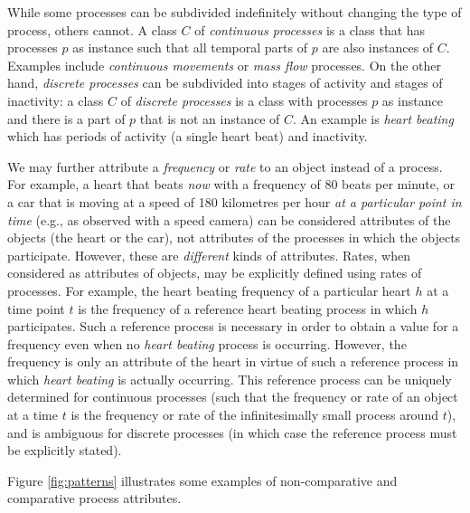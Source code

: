 \documentclass{bioinfo}
\begin{document}
While some processes can be subdivided indefinitely without changing
the type of process, others cannot. A class $C$ of {\em continuous
  processes} is a class that has processes $p$ as instance such that
all temporal parts of $p$ are also instances of $C$. Examples include
{\em continuous movements} or {\em mass flow} processes. On the other
hand, {\em discrete processes} can be subdivided into stages of
activity and stages of inactivity: a class $C$ of {\em discrete
  processes} is a class with processes $p$ as instance and there is a
part of $p$ that is not an instance of $C$. An example is {\em heart
  beating} which has periods of activity (a single heart beat) and
inactivity.

We may further attribute a {\em frequency} or {\em rate} to an object
instead of a process. For example, a heart that beats {\em now} with a
frequency of 80 beats per minute, or a car that is moving at a speed
of 180 kilometres per hour {\em at a particular point in time} (e.g.,
as observed with a speed camera) can be considered attributes of the
objects (the heart or the car), not attributes of the processes in
which the objects participate. However, these are {\em different}
kinds of attributes. Rates, when considered as attributes of objects,
may be explicitly defined using rates of processes. For example, the
heart beating frequency of a particular heart $h$ at a time point $t$
is the frequency of a reference heart beating process in which $h$
participates. Such a reference process is necessary in order to obtain
a value for a frequency even when no {\em heart beating} process is
occurring. However, the frequency is only an attribute of the heart in
virtue of such a reference process in which {\em heart beating} is
actually occurring.  This reference process can be uniquely determined
for continuous processes (such that the frequency or rate of an object
at a time $t$ is the frequency or rate of the infinitesimally small
process around $t$), and is ambiguous for discrete processes (in which
case the reference process must be explicitly stated).

Figure \ref{fig:patterns} illustrates some examples of
non-comparative and comparative process attributes.

\end{document}
